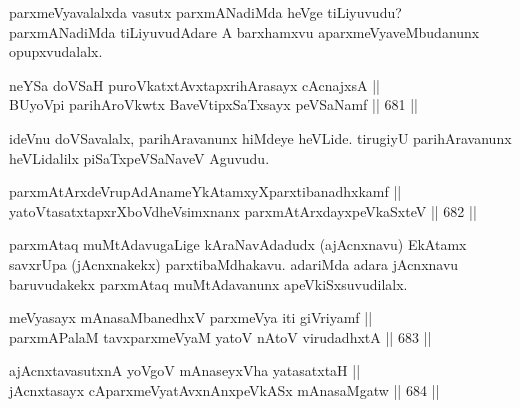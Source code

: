 \begin{artha} 
parxmeVyavalalxda vasutx parxmANadiMda heVge tiLiyuvudu? parxmANadiMda 
tiLiyuvudAdare A barxhamxvu aparxmeVyaveMbudanunx opupxvudalalx.
\end{artha}


\begin{shl}
neYSa doVSaH puroVkatxtAvxtapxrihArasayx cAcnajxsA || \\
BUyoV\s pi parihAroVkwtx BaveVtipxSaTxsayx peVSaNamf \hfill || 681 ||  
\end{shl}

\begin{artha} 
ideVnu doVSavalalx, parihAravanunx hiMdeye heVLide. tirugiyU 
parihAravanunx heVLidalilx piSaTxpeVSaNaveV Aguvudu.
\end{artha}


\begin{shl}
\footnotemark[1]parxmAtArxdeVrupAdAnameYkAtamxyXparxtibanadhxkamf || \\
yatoV\s tasatxtapxrXboVdheV\s simxnanx parxmAtArxdayxpeVkaSxteV \hfill || 682 ||  
\end{shl}

\begin{artha} 
parxmAtaq muMtAdavugaLige kAraNavAdadudx (ajAcnxnavu) EkAtamx savxrUpa (jAcnxnakekx) parxtibaMdhakavu. adariMda adara jAcnxnavu baruvudakekx parxmAtaq muMtAdavanunx apeVkiSxsuvudilalx.
\end{artha}


\begin{shl}
meVyasayx mAnasaMbanedhxV parxmeVya iti giVriyamf || \\
parxmAPalaM tavxparxmeVyaM yatoV nAtoV virudadhxtA \hfill || 683 ||  
\end{shl}
				
\begin{shl}
ajAcnxtavasutxnA yoVgoV mAnaseyxVha yatasatxtaH || \\
jAcnxtasayx cAparxmeVyatAvxnAnxpeVkASx mAnasaMgatw \hfill || 684 ||  
\end{shl}

